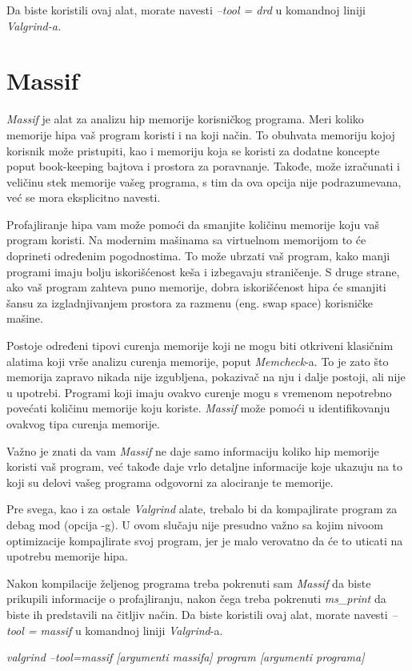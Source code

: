 \documentclass[12pt,oneside]{memoir}
\theoremstyle{plain}
\theoremstyle{definition}
\begin{document}
Da biste koristili ovaj alat, morate navesti \textit{--tool = drd} u komandnoj liniji \textit{Valgrind-a.}

\section{Massif}
\textit{Massif} je alat za analizu hip memorije korisničkog programa. Meri koliko memorije hipa vaš program koristi i na koji način. To obuhvata memoriju kojoj korisnik može pristupiti, kao i memoriju koja se koristi za dodatne koncepte poput book-keeping bajtova i prostora za poravnanje. Takođe, može izračunati i veličinu stek memorije vašeg programa, s tim da ova opcija nije podrazumevana, već se mora eksplicitno navesti.

Profajliranje hipa vam može pomoći da smanjite količinu memorije koju vaš program koristi. Na modernim mašinama sa virtuelnom memorijom to će doprineti određenim pogodnostima. To može ubrzati vaš program, kako manji programi imaju bolju iskorišćenost keša i izbegavaju straničenje. S druge strane, ako vaš program zahteva puno memorije, dobra iskorišćenost hipa će smanjiti šansu za izgladnjivanjem prostora za razmenu (eng. swap space) korisničke mašine. 

Postoje određeni tipovi curenja memorije koji ne mogu biti otkriveni klasičnim alatima koji vrše analizu curenja memorije, poput \textit{Memcheck}-a. To je zato što memorija zapravo nikada nije izgubljena, pokazivač na nju i dalje postoji, ali nije u upotrebi. Programi koji imaju ovakvo curenje mogu s vremenom nepotrebno povećati količinu memorije koju koriste. \textit{Massif} može pomoći u identifikovanju ovakvog tipa curenja memorije.

Važno je znati da vam \textit{Massif} ne daje samo informaciju koliko hip memorije koristi vaš program, već takođe daje vrlo detaljne informacije koje ukazuju na to koji su delovi vašeg programa odgovorni za alociranje te memorije.

Pre svega, kao i za ostale \textit{Valgrind} alate, trebalo bi da kompajlirate program za debag mod (opcija -g). U ovom slučaju nije presudno važno sa kojim nivoom optimizacije kompajlirate svoj program, jer je malo verovatno da će to uticati na upotrebu memorije hipa.

Nakon kompilacije željenog programa treba pokrenuti sam \textit{Massif} da biste prikupili informacije o profajliranju, nakon čega treba pokrenuti \textit{ms\_print} da biste ih predstavili na čitljiv način. Da biste koristili ovaj alat, morate navesti \textit{--tool = massif} u komandnoj liniji \textit{Valgrind}-a.
\begin{center}
\textit{valgrind --tool=massif [argumenti massifa] program [argumenti programa]}
\end{center}
 
\end{document}
